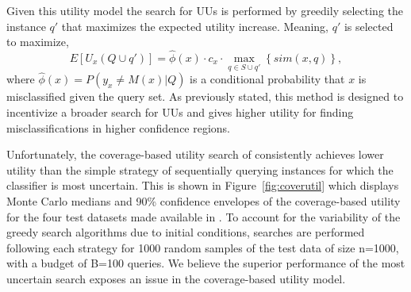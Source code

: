 \documentclass[letterpaper]{article} %
\begin{document}
Given this utility model the search for UUs is performed by greedily selecting the instance $q'$ that maximizes the expected utility increase.  Meaning, $q'$ is selected to maximize, $$E\left[U_x\left(Q \cup q'\right)\right] = \hat{\phi}(x) \cdot c_x \cdot \max_{q \in S \cup q'} \left\{sim\left(x,q \right) \right\},$$ where $\hat{\phi}(x) = P\left(y_x \neq M(x) |Q \right)$ is a conditional probability that $x$ is misclassified given the query set.  As previously stated, this method is designed to incentivize a broader search for UUs and gives higher utility for finding misclassifications in higher confidence regions.  


Unfortunately, the coverage-based utility search of \citet{Bansal2018} consistently achieves lower utility than the simple strategy of sequentially querying instances for which the classifier is most uncertain.  This is shown in Figure~\ref{fig:coverutil} which displays Monte Carlo medians and 90\% confidence envelopes of the coverage-based utility for the four test datasets made available in \citet{Bansal2018}.  To account for the variability of the greedy search algorithms due to initial conditions, searches are performed following each strategy for 1000 random samples of the test data of size n=1000, with a budget of B=100 queries.  We believe the superior performance of the most uncertain search exposes an issue in the coverage-based utility model.  
\end{document}
